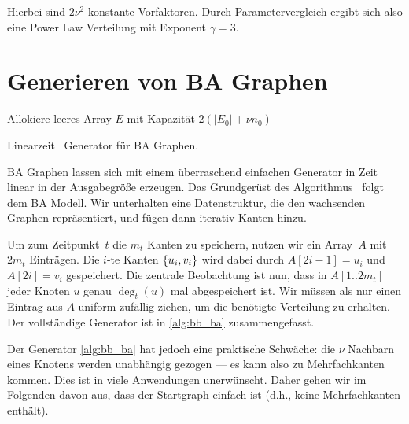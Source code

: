 Hierbei sind $2 \nu^2$ konstante Vorfaktoren.
Durch Parametervergleich ergibt sich also eine Power Law Verteilung mit Exponent $\gamma = 3$.

\section{Generieren von BA Graphen}
\begin{algorithm}[t]

    Allokiere leeres Array $E$ mit Kapazität $2(|E_0| + \nu n_0)$\;


    \caption{Linearzeit~\cite{batagelj2005efficient} Generator für BA Graphen.}
    \label{alg:bb_ba}
    \vspace{1em}
\end{algorithm}


BA Graphen lassen sich mit einem überraschend einfachen Generator in Zeit linear in der Ausgabegröße erzeugen.
Das Grundgerüst des Algorithmus~\cite{batagelj2005efficient} folgt dem BA Modell.
Wir unterhalten eine Datenstruktur, die den wachsenden Graphen repräsentiert, und fügen dann iterativ Kanten hinzu.

Um zum Zeitpunkt~$t$ die $m_t$ Kanten zu speichern, nutzen wir ein Array~$A$ mit $2m_t$ Einträgen.
Die $i$-te Kanten $\left\{u_i, v_i\right\}$ wird dabei durch $A[2i - 1] = u_i$ und $A[2i] = v_i$ gespeichert.
Die zentrale Beobachtung ist nun, dass in $A[1 .. 2m_t]$ jeder Knoten $u$ genau $\deg_t(u)$ mal abgespeichert ist.
Wir müssen als nur einen Eintrag aus $A$ uniform zufällig ziehen, um die benötigte Verteilung zu erhalten.
Der vollständige Generator ist in \cref{alg:bb_ba} zusammengefasst.

Der Generator \cref{alg:bb_ba} hat jedoch eine praktische Schwäche:
die $\nu$ Nachbarn eines Knotens werden unabhängig gezogen --- es kann also zu Mehrfachkanten kommen.
Dies ist in viele Anwendungen unerwünscht.
Daher gehen wir im Folgenden davon aus, dass der Startgraph einfach ist (d.h., keine Mehrfachkanten enthält).

